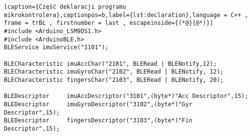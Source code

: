\begin{lstlisting}[caption={Część deklaracji programu mikrokontrolera},captionpos=b,label={lst:declaration},language = C++ , frame = trBL , firstnumber = last , escapeinside={(*@}{@*)}]
#include <Arduino_LSM9DS1.h>
#include <ArduinoBLE.h>
BLEService imuService("1101");

BLECharacteristic imuAccChar("2101", BLERead | BLENotify,12);
BLECharacteristic imuGyroChar("2102", BLERead | BLENotify, 12);
BLECharacteristic fingersChar("2103", BLERead | BLENotify, 20);

BLEDescriptor     imuAccDescriptor("3101",(byte*)"Acc Descriptor",15);
BLEDescriptor     imuGyroDescriptor("3102",(byte*)"Gyr Descriptor",15);
BLEDescriptor     fingersDescriptor("3103",(byte*)"Fin Descriptor",15);
\end{lstlisting}

